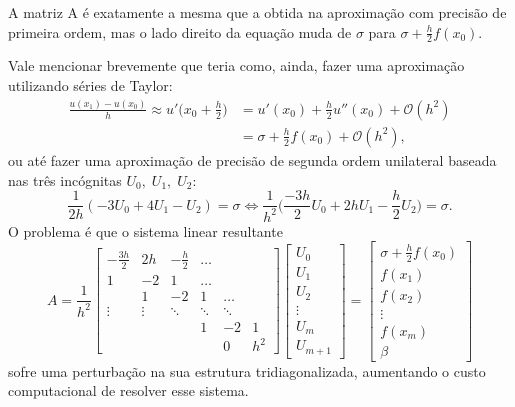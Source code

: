 \documentclass[../differential_methods.tex]{subfiles}
\begin{document}
\begin{tcolorbox}[
		skin=enhanced,
		title=Observação,
		fonttitle=\bfseries,
		colframe=black,
		colbacktitle=cyan!75!white,
		colback=cyan!15,
		colbacklower=black,
		coltitle=black,
		drop fuzzy shadow,
	]
	A matriz A é exatamente a mesma que a obtida na aproximação com precisão de primeira ordem, mas o lado direito da equação muda de \(\sigma \) para \(\sigma + \frac{h}{2}f(x_{0})\).

\end{tcolorbox}

Vale mencionar brevemente que teria como, ainda, fazer uma aproximação utilizando séries de Taylor:
\begin{align*}
	\frac{u(x_1)-u(x_{0})}{h}\approx u'\biggl(x_{0}+\frac{h}{2}\biggr) & = u'(x_{0})+\frac{h}{2}u''(x_{0}) + \mathcal{O}(h^{2}) \\
	                                                                   & = \sigma + \frac{h}{2}f(x_{0})+\mathcal{O}(h^{2}),
\end{align*}
ou até fazer uma aproximação de precisão de segunda ordem unilateral baseada nas três incógnitas \(U_0,\; U_1,\; U_2\):
\[
	\frac{1}{2h}(-3U_{0}+4U_{1}-U_{2})=\sigma \Longleftrightarrow  \frac{1}{h^{2}}\biggl(\frac{-3h}{2}U_{0}+2hU_{1}-\frac{h}{2}U_{2}\biggr) = \sigma.
\]
O problema é que o sistema linear resultante
\[
	A = \frac{1}{h^{2}}\begin{bmatrix}
		-\frac{3h}{2} & 2h     & -\frac{h}{2} & \dotsc &        &       \\
		1             & -2     & 1            & \dotsc &        &       \\
		              & 1      & -2           & 1      & \dotsc &       \\
		\vdots        & \vdots & \ddots       & \ddots & \ddots &       \\
		              &        &              & 1      & -2     & 1     \\
		              &        &              &        & 0      & h^{2}
	\end{bmatrix} \begin{bmatrix}
		U_{0}  \\
		U_{1}  \\
		U_{2}  \\
		\vdots \\
		U_{m}  \\
		U_{m+1}
	\end{bmatrix} = \begin{bmatrix}
		\sigma + \frac{h}{2}f(x_{0}) \\
		f(x_1)                       \\
		f(x_2)                       \\
		\vdots                       \\
		f(x_{m})                     \\
		\beta
	\end{bmatrix}
\]
sofre uma perturbação na sua estrutura tridiagonalizada, aumentando o custo computacional de resolver esse sistema.
\end{document}
